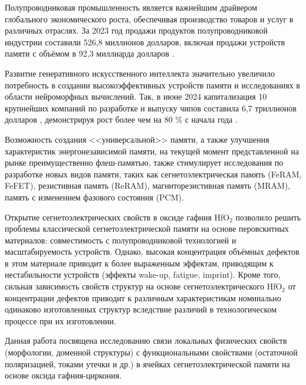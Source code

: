 
{\actuality} 
Полупроводниковая промышленность является важнейшим драйвером глобального экономического роста, обеспечивая производство товаров и услуг в различных отраслях. За 2023 год продажи продуктов полупроводниковой индустрии составили 526,8 миллионов долларов, включая продажи устройств памяти с объёмом в 92,3 миллиарда долларов \cite{danrossoGlobalSemiconductorSales2024}.

Развитие генеративного искусственного интеллекта значительно увеличило потребность в создании высокоэффективных устройств памяти и исследованиях в области нейроморфных вычислений. Так, в июне 2024 капитализация 10 крупнейших компаний по разработке и выпуску чипов составила 6,7 триллионов долларов \cite{LargestSemiconductorCompanies2024a}, демонстрируя рост более чем на 80 \% с начала года \cite{LargestSemiconductorCompanies2024}.

Возможность создания <<универсальной>> памяти, а также улучшения характеристик энергонезависимой памяти, на текущей момент представленной на рынке преимущественно флеш-памятью, также стимулирует исследования по разработке новых видов памяти, таких как сегнетоэлектрическая память (FeRAM, FeFET), резистивная память (ReRAM), магниторезистивная память (MRAM), память с изменением фазового состояния (PCM).

Открытие сегнетоэлектрических свойств в оксиде гафния HfO\(_2\) позволило решить проблемы классической сегнетоэлектрической памяти на основе перовскитных материалов: совместимость с полупроводниковой технологией и масштабируемость устройств. Однако, высокая концентрация объёмных дефектов в этом материале приводит к более выраженным эффектам, приводящим к нестабильности устройств (эффекты wake-up, fatigue, imprint). Кроме того, сильная зависимость свойств структур на основе сегнетоэлектрического HfO\(_2\) от концентрации дефектов приводит к различным характеристикам номинально одинаково изготовленных структур вследствие различий в технологическом процессе при их изготовлении.

Данная работа посвящена исследованию связи локальных физических свойств (морфологии, доменной структуры) с функциональными свойствами (остаточной поляризацией, токами утечки и др.) в ячейках сегнетоэлектрической памяти на основе оксида гафния-циркония.

